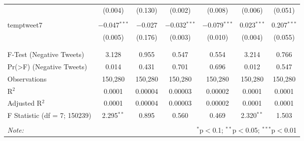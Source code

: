 \begin{table}[!htbp]
\begin{tabular}{@{\extracolsep{5pt}}lcccccc}
  & (0.004) & (0.130) & (0.002) & (0.008) & (0.006) & (0.051) \\ 
  & & & & & & \\ 
 temptweet7 & $-$0.047$^{***}$ & $-$0.027 & $-$0.032$^{***}$ & $-$0.079$^{***}$ & 0.023$^{***}$ & 0.207$^{***}$ \\ 
  & (0.005) & (0.176) & (0.003) & (0.010) & (0.004) & (0.055) \\ 
  & & & & & & \\ 
\hline \\[-1.8ex] 
F-Test (Negative Tweets) & 3.128 & 0.955 & 0.547 & 0.554 & 3.214 & 0.766 \\ 
Pr(>F) (Negative Tweets) & 0.014 & 0.431 & 0.701 & 0.696 & 0.012 & 0.547 \\ 
Observations & 150,280 & 150,280 & 150,280 & 150,280 & 150,280 & 150,280 \\ 
R$^{2}$ & 0.0001 & 0.00004 & 0.00003 & 0.00002 & 0.0001 & 0.0001 \\ 
Adjusted R$^{2}$ & 0.0001 & 0.00004 & 0.00003 & 0.00002 & 0.0001 & 0.0001 \\ 
F Statistic (df = 7; 150239) & 2.295$^{**}$ & 0.895 & 0.560 & 0.469 & 2.320$^{**}$ & 1.503 \\ 
\hline 
\hline \\[-1.8ex] 
\textit{Note:}  & \multicolumn{6}{r}{$^{*}$p$<$0.1; $^{**}$p$<$0.05; $^{***}$p$<$0.01} \\ 
\end{tabular} 
\end{table} 
